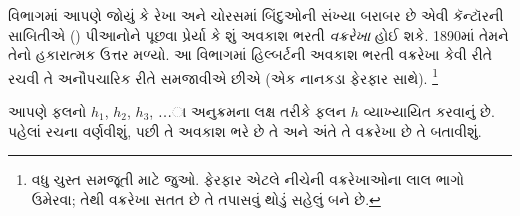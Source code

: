\documentclass[../../../include/open-logic-section]{subfiles}
\begin{document}


 વિભાગમાં
આપણે જોયું કે રેખા અને
ચોરસમાં બિંદુઓની સંખ્યા
બરાબર છે એવી કૅન્ટૉરની
સાબિતીએ
()
પીઆનોને પૂછવા પ્રેર્યા કે
શું અવકાશ ભરતી
\emph{વક્રરેખા} હોઈ શકે.
1890માં તેમને તેનો
હકારાત્મક ઉત્તર મળ્યો.
આ વિભાગમાં હિલ્બર્ટની
અવકાશ ભરતી વક્રરેખા
કેવી રીતે રચવી તે
અનૌપચારિક રીતે
સમજાવીએ છીએ
(એક નાનકડા ફેરફાર સાથે).
\footnote{વધુ ચુસ્ત સમજૂતી
માટે \cite{Rose2010} જુઓ.
ફેરફાર એટલે નીચેની
વક્રરેખાઓના લાલ
ભાગો ઉમેરવા; તેથી
વક્રરેખા સતત છે તે
તપાસવું થોડું સહેલું બને છે.}

આપણે ફલનો $h_1$, $h_2$, $h_3$,
\dots{}ા અનુક્રમના
લક્ષ તરીકે ફલન $h$
વ્યાખ્યાયિત કરવાનું છે.
પહેલાં રચના વર્ણવીશું,
પછી તે અવકાશ ભરે છે
તે અને અંતે તે
વક્રરેખા છે તે બતાવીશું.
\end{document}
